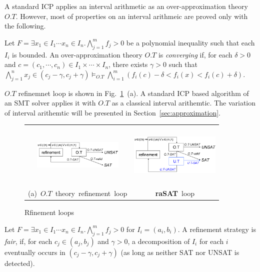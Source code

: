 \documentclass[runningheads,a4paper,oribibl]{llncs}
\begin{document}
A standard ICP applies an interval arithmetic as an over-approximation theory $O.T$. 
However, most of properties on an interval arithmeic are proved only with the following. 

\begin{definition} \label{def:completeOT}
Let
$F = \exists x_1 \in I_1 \cdots x_n \in I_n. \bigwedge \limits_{j=1}^m f_j > 0$
be a polynomial inequality such that each $I_i$ is bounded. 
An over-approximation theory $O.T$ is {\em converging} 
if, for each $\delta > 0$ and $c = (c_1, \cdots, c_n) \in I_1 \times \cdots \times I_n$, 
there exists $\gamma > 0$ such that 
$\bigwedge \limits_{j=1}^n x_j \in (c_j - \gamma, c_j + \gamma) \models_{O.T} 
 \bigwedge \limits_{i=1}^m (f_i(c) - \delta < f_i(x) < f_i(c) + \delta)$. 
\end{definition}

$O.T$ refinemnet loop is shown in Fig.~\ref{fig:OTrefine}~(a). 
A standard ICP based algorithm of an SMT solver applies it with $O.T$ as a classical interval arithemtic. 
The variation of interval arithemtic will be presented in Section~\ref{sec:approximation}. 
\begin{figure}[ht]
\begin{minipage}[b]{1.0\linewidth}
\centering
\begin{tabular}{cc}
\includegraphics[height=1.2in,width=1.7in]{OTloop.png} & 
\includegraphics[height=1.2in,width=1.7in]{rasatloop.png} \\   
\mbox{(a) $O.T$ theory refinement loop} & \mbox{{\bf raSAT} loop} \\
\end{tabular}
\end{minipage} 
\caption{Rfinement loops} 
\label{fig:OTrefine} 
\end{figure}


\begin{definition} 
Let
$F = \exists x_1 \in I_1 \cdots x_n \in I_n. \bigwedge \limits_{j=1}^m f_j > 0$
for $I_i = (a_i,b_i)$.
A refinement strategy is {\em fair}, if, for each $c_j \in (a_j,b_j)$ and $\gamma > 0$, 
a decomposition of $I_i$ for each $i$ eventually occurs in $(c_j - \gamma, c_j + \gamma)$ 
(as long as neither SAT nor UNSAT is detected). 
\end{definition}
\end{document}
